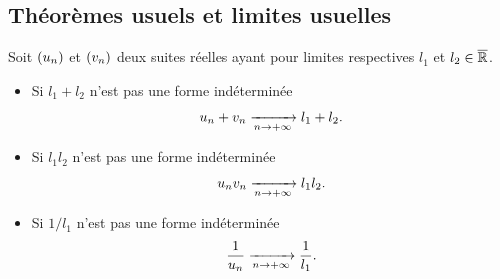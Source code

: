 \documentclass{magnolia}
\begin{document}

\subsection{Théorèmes usuels et limites usuelles}

\begin{proposition}[utile=-3]
Soit $\left(u_n\right)$ et $\left(v_n\right)$ deux suites réelles ayant pour limites respectives
$l_1$ et $l_2\in\overline{\mathbb{R}}$.
\begin{itemize}
\item Si $l_1+l_2$ n'est pas une forme indéterminée
  \[u_n + v_n \xrightarrow[n\rightarrow +\infty]{} l_1+l_2.\]
\item Si $l_1 l_2$ n'est pas une forme indéterminée
  \[u_n v_n \xrightarrow[n\rightarrow +\infty]{} l_1 l_2.\]
\item Si $1/l_1$ n'est pas une forme indéterminée
  \[\frac{1}{u_n} \xrightarrow[n\rightarrow +\infty]{} \frac{1}{l_1}.\]
\end{itemize}
\end{proposition}
\end{document}
